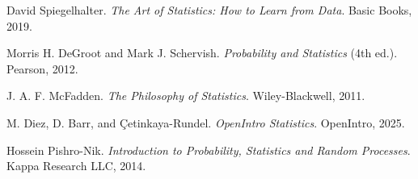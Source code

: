 \documentclass{book}
\begin{document}
\backmatter
 
\begin{thebibliography}{999}

David Spiegelhalter. 
\textit{The Art of Statistics: How to Learn from Data}. 
Basic Books, 2019.

Morris H. DeGroot and Mark J. Schervish.
\textit{Probability and Statistics} (4th ed.).
Pearson, 2012.

J. A. F. McFadden.
\textit{The Philosophy of Statistics}.
Wiley-Blackwell, 2011.

M. Diez, D. Barr, and Çetinkaya-Rundel.
\textit{OpenIntro Statistics}.
OpenIntro, 2025.

Hossein Pishro-Nik.
\textit{Introduction to Probability, Statistics and Random Processes}.
Kappa Research LLC, 2014.

\end{thebibliography}
\end{document}
